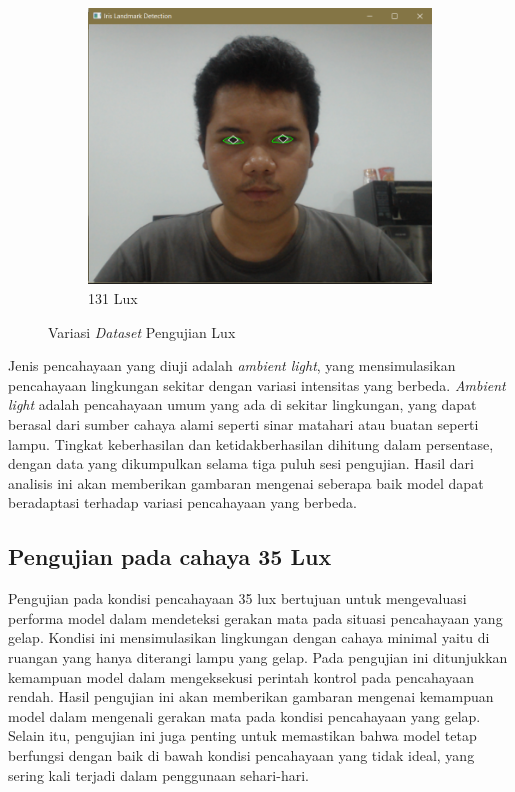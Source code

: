 \begin{figure}[H]
  \begin{subfigure}[b]{0.4\linewidth}
      \centering %
      \includegraphics[width=\linewidth]{gambar/bab4/131.png}
      \caption{131 Lux}
      \label{fig:imagec}
  \end{subfigure}
  \caption{Variasi \emph{Dataset} Pengujian Lux}
  \label{fig:Variasi Lux}
\end{figure}

Jenis pencahayaan yang diuji adalah \emph{ambient light}, yang mensimulasikan pencahayaan lingkungan sekitar dengan variasi intensitas yang berbeda. \emph{Ambient light} adalah pencahayaan umum yang ada di sekitar lingkungan, yang dapat berasal dari sumber cahaya alami seperti sinar matahari atau buatan seperti lampu. Tingkat keberhasilan dan ketidakberhasilan dihitung dalam persentase, dengan data yang dikumpulkan selama tiga puluh sesi pengujian. Hasil dari analisis ini akan memberikan gambaran mengenai seberapa baik model dapat beradaptasi terhadap variasi pencahayaan yang berbeda.

\subsection{Pengujian pada cahaya 35 Lux}

Pengujian pada kondisi pencahayaan 35 lux bertujuan untuk mengevaluasi performa model dalam mendeteksi gerakan mata pada situasi pencahayaan yang gelap. Kondisi ini mensimulasikan lingkungan dengan cahaya minimal yaitu di ruangan yang hanya diterangi lampu yang gelap. Pada pengujian ini ditunjukkan kemampuan model dalam mengeksekusi perintah kontrol pada pencahayaan rendah. Hasil pengujian ini akan memberikan gambaran mengenai kemampuan model dalam mengenali gerakan mata pada kondisi pencahayaan yang gelap. Selain itu, pengujian ini juga penting untuk memastikan bahwa model tetap berfungsi dengan baik di bawah kondisi pencahayaan yang tidak ideal, yang sering kali terjadi dalam penggunaan sehari-hari.

